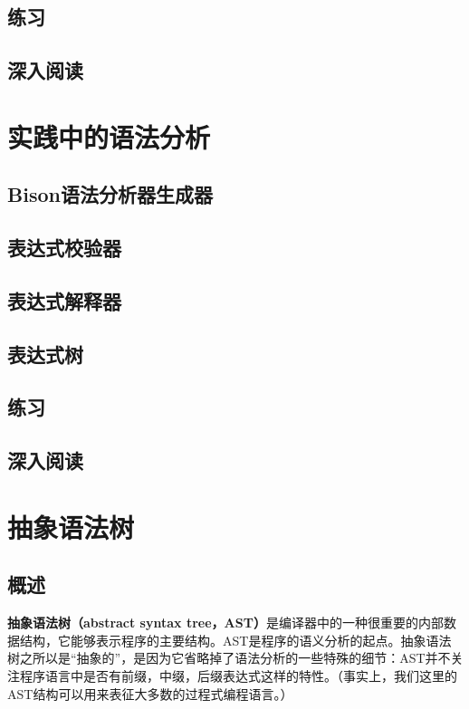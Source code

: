 \documentclass[cn,11pt,chinese]{elegantbook}
\begin{document}
\section{练习}

\section{深入阅读}

\chapter{实践中的语法分析}

\section{Bison语法分析器生成器}

\section{表达式校验器}

\section{表达式解释器}

\section{表达式树}

\section{练习}

\section{深入阅读}

\chapter{抽象语法树}

\section{概述}

\textbf{抽象语法树（abstract syntax tree，AST）}是编译器中的一种很重要的内部数据结构，它能够表示程序的主要结构。AST是程序的语义分析的起点。抽象语法树之所以是“抽象的”，是因为它省略掉了语法分析的一些特殊的细节：AST并不关注程序语言中是否有前缀，中缀，后缀表达式这样的特性。（事实上，我们这里的AST结构可以用来表征大多数的过程式编程语言。）
\end{document}
